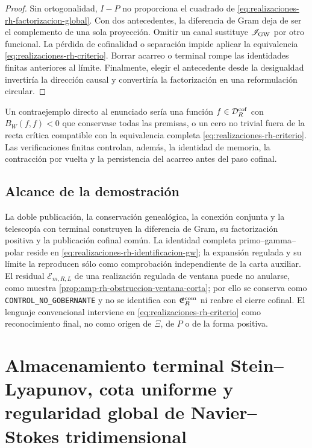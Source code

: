 \begin{proof}
Sin ortogonalidad, \(I-P\) no proporciona el cuadrado de
\eqref{eq:realizaciones-rh-factorizacion-global}. Con dos antecedentes, la
diferencia de Gram deja de ser el complemento de una sola proyección. Omitir
un canal sustituye \(\mathscr I_{\rm GW}\) por otro funcional. La pérdida de
cofinalidad o separación impide aplicar la equivalencia
\eqref{eq:realizaciones-rh-criterio}. Borrar acarreo o terminal rompe las
identidades finitas anteriores al límite. Finalmente, elegir el antecedente
desde la desigualdad invertiría la dirección causal y convertiría la
factorización en una reformulación circular.
\end{proof}

Un contraejemplo directo al enunciado sería una función
\(f\in\mathcal D_R^{\rm cof}\) con \(B_W(f,f)<0\) que conservase todas las
premisas, o un cero no trivial fuera de la recta crítica compatible con la
equivalencia completa \eqref{eq:realizaciones-rh-criterio}. Las
verificaciones finitas controlan, además, la identidad de memoria, la contracción por vuelta
y la persistencia del acarreo antes del paso cofinal.

\section*{Alcance de la demostración}

La doble publicación, la conservación genealógica, la conexión conjunta y la
telescopía con terminal construyen la diferencia de Gram, su factorización
positiva y la publicación cofinal común. La identidad completa
primo--gamma--polar reside en
\eqref{eq:realizaciones-rh-identificacion-gw}; la expansión regulada y su
límite la reproducen sólo como comprobación independiente de la carta
auxiliar.
El residual \(\mathcal E_{m,R,L}\) de una realización regulada de ventana
puede no anularse, como muestra
\cref{prop:amp-rh-obstruccion-ventana-corta}; por ello se conserva como
\texttt{CONTROL\_NO\_GOBERNANTE} y no se identifica con
\(\mathfrak E_R^{\rm com}\) ni reabre el cierre cofinal. El lenguaje
convencional interviene en \eqref{eq:realizaciones-rh-criterio} como
reconocimiento final, no como origen de \(\Xi\), de \(P\) o de la forma
positiva.

\chapter{Almacenamiento terminal Stein--Lyapunov, cota uniforme y regularidad
global de Navier--Stokes tridimensional}


